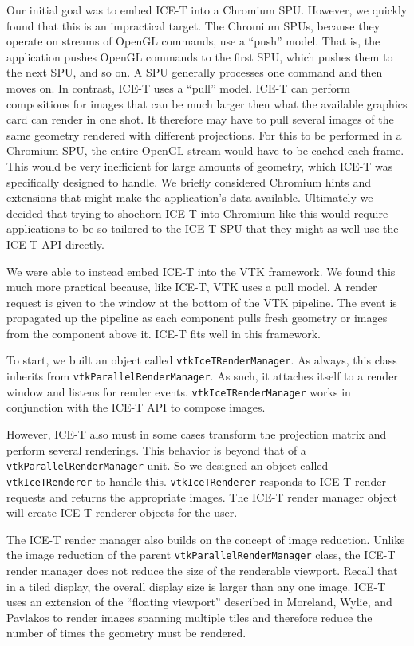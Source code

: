 \documentclass{acmsiggraph}
\newcommand{\cidentifier}[1]{\texttt{#1}}
\begin{document}
  Our initial goal was to embed ICE-T into a Chromium SPU.  However, we
  quickly found that this is an impractical target.  The Chromium SPUs,
  because they operate on streams of OpenGL commands, use a ``push'' model.
  That is, the application pushes OpenGL commands to the first SPU, which
  pushes them to the next SPU, and so on.  A SPU generally processes one
  command and then moves on.  In contrast, ICE-T uses a ``pull'' model.
  ICE-T can perform compositions for images that can be much larger then
  what the available graphics card can render in one shot.  It therefore
  may have to pull several images of the same geometry rendered with
  different projections.  For this to be performed in a Chromium SPU, the
  entire OpenGL stream would have to be cached each frame.  This would be
  very inefficient for large amounts of geometry, which ICE-T was
  specifically designed to handle.  We briefly considered Chromium hints
  and extensions that might make the application's data available.
  Ultimately we decided that trying to shoehorn ICE-T into Chromium like
  this would require applications to be so tailored to the ICE-T SPU that
  they might as well use the ICE-T API directly.

  We were able to instead embed ICE-T into the VTK framework.  We found
  this much more practical because, like ICE-T, VTK uses a pull model.  A
  render request is given to the window at the bottom of the VTK pipeline.
  The event is propagated up the pipeline as each component pulls fresh
  geometry or images from the component above it.  ICE-T fits well in this
  framework.

  To start, we built an object called
  \cidentifier{vtk\-Ice\-T\-Render\-Manager}.  As always, this class
  inherits from \cidentifier{vtk\-Parallel\-Render\-Manager}.  As such, it
  attaches itself to a render window and listens for render events.
  \cidentifier{vtk\-Ice\-T\-Render\-Manager} works in conjunction with the
  ICE-T API to compose images.

  However, ICE-T also must in some cases transform the projection matrix
  and perform several renderings.  This behavior is beyond that of a
  \cidentifier{vtk\-Parallel\-Render\-Manager} unit.  So we designed an
  object called \cidentifier{vtk\-Ice\-T\-Renderer} to handle this.
  \cidentifier{vtk\-Ice\-T\-Renderer} responds to ICE-T render requests and
  returns the appropriate images.  The ICE-T render manager object will
  create ICE-T renderer objects for the user.

  The ICE-T render manager also builds on the concept of image reduction.
  Unlike the image reduction of the parent
  \cidentifier{vtk\-Parallel\-Render\-Manager} class, the ICE-T render
  manager does not reduce the size of the renderable viewport.  Recall that
  in a tiled display, the overall display size is larger than any one
  image.  ICE-T uses an extension of the ``floating viewport'' described in
  Moreland, Wylie, and Pavlakos \cite{Moreland01} to render images spanning
  multiple tiles and therefore reduce the number of times the geometry must
  be rendered.
\end{document}
